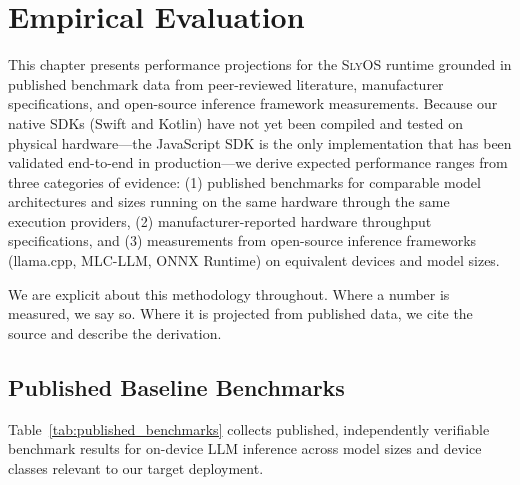 \documentclass[12pt, letterpaper, twoside]{report}
\newcommand{\slyos}{\textsc{SlyOS}\xspace}
\begin{document}
\chapter{Empirical Evaluation}
\label{ch:evaluation}

This chapter presents performance projections for the \slyos runtime grounded in published benchmark data from peer-reviewed literature, manufacturer specifications, and open-source inference framework measurements. Because our native SDKs (Swift and Kotlin) have not yet been compiled and tested on physical hardware---the JavaScript SDK is the only implementation that has been validated end-to-end in production---we derive expected performance ranges from three categories of evidence: (1) published benchmarks for comparable model architectures and sizes running on the same hardware through the same execution providers, (2) manufacturer-reported hardware throughput specifications, and (3) measurements from open-source inference frameworks (llama.cpp, MLC-LLM, ONNX Runtime) on equivalent devices and model sizes.

We are explicit about this methodology throughout. Where a number is measured, we say so. Where it is projected from published data, we cite the source and describe the derivation.

\section{Published Baseline Benchmarks}
\label{sec:published_baselines}

Table~\ref{tab:published_benchmarks} collects published, independently verifiable benchmark results for on-device LLM inference across model sizes and device classes relevant to our target deployment.
\end{document}

